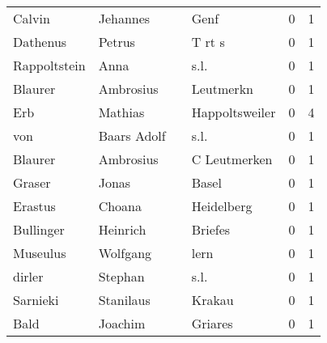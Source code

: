 \begin{center}
\begin{tiny}
\begin{longtabu}{llllrr}
                   Calvin &                           Jehannes &             &                                        Genf &          0 &         1 \\
                 Dathenus &                             Petrus &             &                                      T rt s &          0 &         1 \\
             Rappoltstein &                               Anna &             &                                        s.l. &          0 &         1 \\
                  Blaurer &                          Ambrosius &             &                                   Leutmerkn &          0 &         1 \\
                      Erb &                            Mathias &             &                              Happoltsweiler &          0 &         4 \\
                      von &                        Baars Adolf &             &                                        s.l. &          0 &         1 \\
                  Blaurer &                          Ambrosius &             &                                C Leutmerken &          0 &         1 \\
                   Graser &                              Jonas &             &                                       Basel &          0 &         1 \\
                  Erastus &                             Choana &             &                                  Heidelberg &          0 &         1 \\
                Bullinger &                           Heinrich &             &                                     Briefes &          0 &         1 \\
                 Museulus &                           Wolfgang &             &                                        lern &          0 &         1 \\
                   dirler &                            Stephan &             &                                        s.l. &          0 &         1 \\
                 Sarnieki &                          Stanilaus &             &                                      Krakau &          0 &         1 \\
                     Bald &                            Joachim &             &                                     Griares &          0 &         1 \\

\end{longtabu}
\end{tiny}
\end{center}
